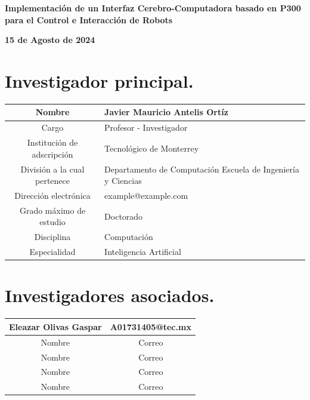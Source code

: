 \documentclass[12pt]{article}
\begin{document}
\begin{flushleft}
    \textbf{\Large Implementación de un Interfaz Cerebro-Computadora basado en P300 para el Control e Interacción de Robots}
    \par
    \textbf{15 de Agosto de 2024}
\end{flushleft}

\section{Investigador principal.}

\begin{table}[h!]
    \centering
    \begin{tabular}{|c|p{6cm}|} \hline
        Nombre & Javier Mauricio Antelis Ortíz \\ \hline
        Cargo & Profesor - Investigador \\ \hline
        Institución de adscripción & Tecnológico de Monterrey \\ \hline
        División a la cual pertenece & Departamento de Computación \newline Escuela de Ingeniería y Ciencias \\ \hline
        Dirección electrónica & example@example.com \\ \hline
        Grado máximo de estudio & Doctorado \\ \hline
        Disciplina & Computación \\ \hline
        Especialidad & Inteligencia Artificial \\ \hline
    \end{tabular}
\end{table}

\section{Investigadores asociados.}

\begin{table}[h!]
    \centering
    \begin{tabular}{|c|c|} \hline
        Eleazar Olivas Gaspar & A01731405@tec.mx \\ \hline
        Nombre & Correo \\ \hline
        Nombre & Correo \\ \hline
        Nombre & Correo \\ \hline
        Nombre & Correo \\ \hline
    \end{tabular}
\end{table}
\end{document}
